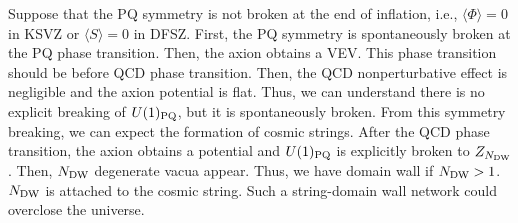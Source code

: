 \documentclass[11pt,a4paper]{article}
\begin{document}
Suppose that the PQ symmetry is not broken at the end of inflation, i.e., $\langle \Phi \rangle = 0$ in KSVZ or $\langle S \rangle = 0$ in DFSZ.
First, the PQ symmetry is spontaneously broken at the PQ phase transition. Then, the axion obtains a VEV. This phase transition should be before QCD phase transition. Then, the QCD nonperturbative effect is negligible and the axion potential is flat. Thus, we can understand there is no explicit breaking of $U(1)_{\rm PQ}$, but it is spontaneously broken. From this symmetry breaking, we can expect the formation of cosmic strings.
After the QCD phase transition, the axion obtains a potential and $U(1)_{\rm PQ}$ is explicitly broken to $Z_{N_{\rm DW}}$. Then, $N_{\rm DW}$ degenerate vacua appear. Thus, we have domain wall if $N_{\rm DW} > 1$. $N_{\rm DW}$ is attached to the cosmic string. Such a string-domain wall network could overclose the universe.
\end{document}
